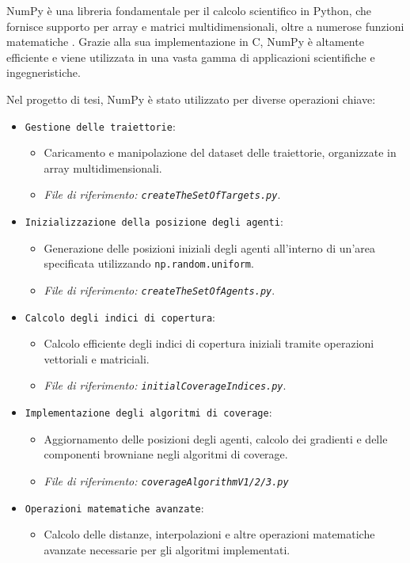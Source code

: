 \documentclass[twoside]{article}
\begin{document}
NumPy è una libreria fondamentale per il calcolo scientifico in Python, che fornisce supporto per array e matrici multidimensionali, oltre a numerose funzioni matematiche \cite{NumPyDocumentation}. Grazie alla sua implementazione in C, NumPy è altamente efficiente e viene utilizzata in una vasta gamma di applicazioni scientifiche e ingegneristiche.

Nel progetto di tesi, NumPy è stato utilizzato per diverse operazioni chiave:

\begin{itemize}
    \item \verb|Gestione delle traiettorie|:
    \begin{itemize}
        \item Caricamento e manipolazione del dataset delle traiettorie, organizzate in array multidimensionali.
        \item \textit{File di riferimento: \texttt{createTheSetOfTargets.py}}.
    \end{itemize}

    \item \verb|Inizializzazione della posizione degli agenti|:
    \begin{itemize}
        \item Generazione delle posizioni iniziali degli agenti all'interno di un'area specificata utilizzando \verb|np.random.uniform|.
        \item \textit{File di riferimento: \texttt{createTheSetOfAgents.py}}.
    \end{itemize}

    \item \verb|Calcolo degli indici di copertura|:
    \begin{itemize}
        \item Calcolo efficiente degli indici di copertura iniziali tramite operazioni vettoriali e matriciali.
        \item \textit{File di riferimento: \texttt{initialCoverageIndices.py}}.
    \end{itemize}

    \item \verb|Implementazione degli algoritmi di coverage|:
    \begin{itemize}
        \item Aggiornamento delle posizioni degli agenti, calcolo dei gradienti e delle componenti browniane negli algoritmi di coverage.
        \item \textit{File di riferimento: \texttt{coverageAlgorithmV1/2/3.py}}
    \end{itemize}

    \item \verb|Operazioni matematiche avanzate|:
    \begin{itemize}
        \item Calcolo delle distanze, interpolazioni e altre operazioni matematiche avanzate necessarie per gli algoritmi implementati.
    \end{itemize}
\end{itemize}
\end{document}
